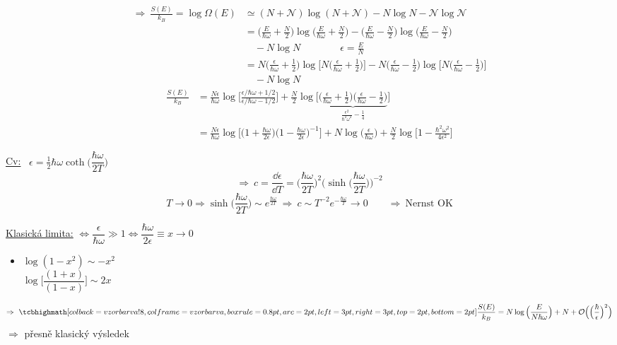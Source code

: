 {\color{NavyBlue}
\begin{align*}
  \Rightarrow\ \frac{S(E)}{k_B} = \log\Omega(E) &\simeq (N + \mathcal N)\log(N + \mathcal N) - N\log N - \mathcal N\log\mathcal N \\
  &= \Big(\frac{E}{\hbar\omega} + \frac N2\Big)\log\Big(\frac{E}{\hbar\omega} + \frac N2\Big)
     - \Big(\frac{E}{\hbar\omega} - \frac N2\Big)\log\Big(\frac{E}{\hbar\omega} - \frac N2\Big) \\
  &\quad - N\log N \qquad\qquad \epsilon = \frac EN \\
  &= N\Big(\frac{\epsilon}{\hbar\omega} + \frac12\Big)\log\Big[N\Big(\frac{\epsilon}{\hbar\omega} + \frac12\Big)\Big]
     - N\Big(\frac{\epsilon}{\hbar\omega} - \frac12\Big)\log\Big[N\Big(\frac{\epsilon}{\hbar\omega} - \frac12\Big)\Big] \\
  &\quad - N\log N
\end{align*}
\begin{align*}
  \frac{S(E)}{k_B} &= \frac{N\epsilon}{\hbar\omega}\log\Big[\frac{\epsilon/\hbar\omega + 1/2}{\epsilon/\hbar\omega - 1/2}\Big]
     + \frac N2\log\Big[\underbrace{\Big(\frac{\epsilon}{\hbar\omega} + \frac12\Big)\Big(\frac{\epsilon}{\hbar\omega} - \frac12\Big)}_{\frac{\epsilon^2}{\hbar^2\omega^2} - \frac14}\Big] \\
  &= \frac{N\epsilon}{\hbar\omega}\log\Big[\Big(1 + \frac{\hbar\omega}{2\epsilon}\Big)\Big(1 - \frac{\hbar\omega}{2\epsilon}\Big)^{-1}\Big]
     + N\log\Big(\frac{\epsilon}{\hbar\omega}\Big) + \frac N2\log\Big[1 - \frac{\hbar^2\omega^2}{4\epsilon^2}\Big]
\end{align*}

\underline{Cv:} \ $\epsilon = \frac12\hbar\omega\coth\Big(\dfrac{\hbar\omega}{2T}\Big)$
\[
  \Rightarrow\ c = \frac{\dd\epsilon}{\dd T} = \Big(\frac{\hbar\omega}{2T}\Big)^2\Big(\sinh\Big(\frac{\hbar\omega}{2T}\Big)\Big)^{-2}
\]
\[
  T\to0 \Rightarrow \sinh\Big(\frac{\hbar\omega}{2T}\Big) \sim e^{\frac{\hbar\omega}{2T}} \ \Rightarrow\ c \sim T^{-2}e^{-\frac{\hbar\omega}{T}} \to 0
  \qquad\Rightarrow\ \text{Nernst OK}
\]

\underline{Klasická limita:} \quad {} $\Leftrightarrow \dfrac{\epsilon}{\hbar\omega} \gg 1 \Leftrightarrow \dfrac{\hbar\omega}{2\epsilon} \equiv x \to 0$

\begin{minipage}{0.35\textwidth}
\begin{itemize}[nosep]
  \item $\log(1 - x^2) \sim -x^2$ \\
        $\log\Big[\dfrac{(1+x)}{(1-x)}\Big] \sim 2x$
\end{itemize}
\end{minipage}
\begin{minipage}{0.62\textwidth}
\[
  \Rightarrow\ \vzorec{\frac{S(E)}{k_B} = N\log\Big(\frac{E}{N\hbar\omega}\Big) + N + \mathcal{O}\Big(\Big(\frac{\hbar}{\epsilon}\Big)^2\Big)}
\]
\quad $\Rightarrow$ přesně klasický výsledek
\end{minipage}}
